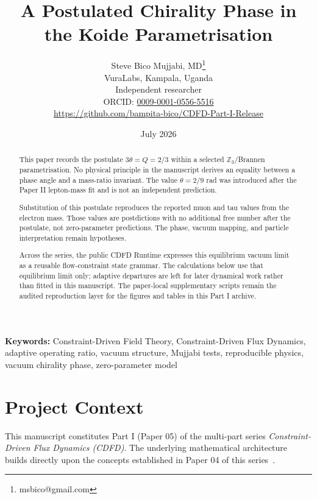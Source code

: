 \documentclass[11pt]{article}
\begin{document}
\title{A Postulated Chirality Phase in the Koide Parametrisation}

\author{Steve Bico Mujjabi, MD\thanks{msbico@gmail.com}\\
VuraLabs, Kampala, Uganda\\
Independent researcher\\
ORCID: \href{https://orcid.org/0009-0001-0556-5516}{0009-0001-0556-5516}\\
\url{https://github.com/bampita-bico/CDFD-Part-I-Release}}

\date{July 2026}

\maketitle

\begin{abstract}
This paper records the postulate $3\theta=Q=2/3$ within a selected
$\mathbb{Z}_3$/Brannen parametrisation. No physical principle in the manuscript
derives an equality between a phase angle and a mass-ratio invariant. The value
$\theta=2/9$ rad was introduced after the Paper II lepton-mass fit and is not an
independent prediction.

Substitution of this postulate reproduces the reported muon and tau values from
the electron mass. Those values are postdictions with no additional free number
after the postulate, not zero-parameter predictions. The phase, vacuum mapping,
and particle interpretation remain hypotheses.

Across the series, the public CDFD Runtime expresses this equilibrium vacuum
limit as a reusable flow-constraint state grammar. The calculations below use
that equilibrium limit only; adaptive departures are left for later dynamical
work rather than fitted in this manuscript. The paper-local supplementary
scripts remain the audited reproduction layer for the figures and tables in
this Part I archive.
\end{abstract}

\noindent\textbf{Keywords:} Constraint-Driven Field Theory, Constraint-Driven Flux Dynamics, adaptive operating ratio, vacuum structure, Mujjabi tests, reproducible physics, vacuum chirality phase, zero-parameter model

\vspace{0.75em}
\linenumbers

\section*{Project Context}
This manuscript constitutes Part I (Paper 05) of the multi-part series
\textit{Constraint-Driven Flux Dynamics (CDFD)}. The underlying mathematical
architecture builds directly upon the concepts established in Paper 04 of this
series~\cite{MujjabiIV2026}.
\end{document}

